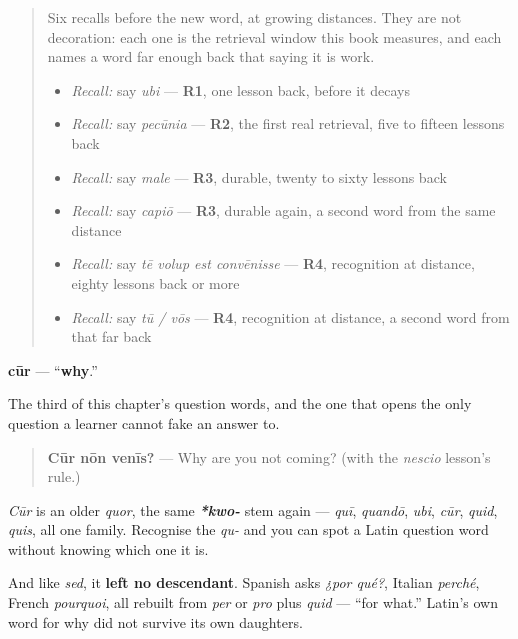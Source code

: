 \label{lesson:LA-C52-cur}



\begin{quote}
Six recalls before the new word, at growing distances. They are not decoration: each one is the retrieval window this book measures, and each names a word far enough back that saying it is work.

\begin{itemize}
\raggedright
  \item \emph{Recall:} say \emph{ubi} — \textbf{R1}, one lesson back, before it decays
  \item \emph{Recall:} say \emph{pecūnia} — \textbf{R2}, the first real retrieval, five to fifteen lessons back
  \item \emph{Recall:} say \emph{male} — \textbf{R3}, durable, twenty to sixty lessons back
  \item \emph{Recall:} say \emph{capiō} — \textbf{R3}, durable again, a second word from the same distance
  \item \emph{Recall:} say \emph{tē volup est convēnisse} — \textbf{R4}, recognition at distance, eighty lessons back or more
  \item \emph{Recall:} say \emph{tū / vōs} — \textbf{R4}, recognition at distance, a second word from that far back
\end{itemize}
\end{quote}

\begin{cousinweb}
\textbf{cūr} — \textquotedblleft{}\textbf{why}.\textquotedblright{}

The third of this chapter's question words, and the one that opens the only question a learner cannot fake an answer to.

\begin{quote}
\textbf{Cūr nōn venīs?} — Why are you not coming? (with the \emph{nescio} lesson's rule.)
\end{quote}

\emph{Cūr} is an older \emph{quor}, the same \emph{\textbf{*kwo-}} stem again — \emph{quī}, \emph{quandō}, \emph{ubi}, \emph{cūr}, \emph{quid}, \emph{quis}, all one family. Recognise the \emph{qu-} and you can spot a Latin question word without knowing which one it is.

And like \emph{sed}, it \textbf{left no descendant}. Spanish asks \emph{¿por qué?}, Italian \emph{perché}, French \emph{pourquoi}, all rebuilt from \emph{per} or \emph{pro} plus \emph{quid} — \textquotedblleft{}for what.\textquotedblright{} Latin's own word for why did not survive its own daughters.
\end{cousinweb}

